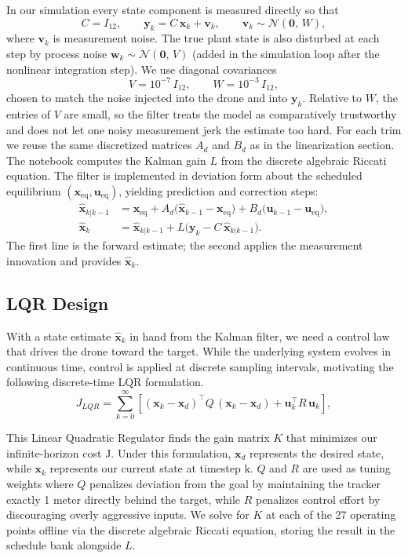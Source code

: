 \documentclass[11pt]{amsart}
\begin{document}
In our simulation every state component is measured directly so that
\[
C = I_{12},
\qquad
\mathbf{y}_k = C\,\mathbf{x}_k + \mathbf{v}_k,
\qquad
\mathbf{v}_k \sim \mathcal{N}(\mathbf{0},\,W),
\]
where $\mathbf{v}_k$ is measurement noise. The true plant state is also disturbed at each step by process noise $\mathbf{w}_k \sim \mathcal{N}(\mathbf{0},\,V)$ (added in the simulation loop after the nonlinear integration step). We use diagonal covariances
\[
V = 10^{-7}\, I_{12},
\qquad
W = 10^{-3}\, I_{12},
\]
chosen to match the noise injected into the drone and into $\mathbf{y}_k$. Relative to $W$, the entries of $V$ are small, so the filter treats the model as comparatively trustworthy and does not let one noisy measurement jerk the estimate too hard.
For each trim we reuse the same discretized matrices $A_d$ and $B_d$ as in the linearization section. The notebook computes the Kalman gain $L$ from the discrete algebraic Riccati equation. The filter is implemented in deviation form about the scheduled equilibrium $(\mathbf{x}_{\mathrm{eq}},\mathbf{u}_{\mathrm{eq}})$, yielding prediction and correction steps:
\begin{align*}
\hat{\mathbf{x}}_{k|k-1}
&= \mathbf{x}_{\mathrm{eq}}
 + A_d\bigl(\hat{\mathbf{x}}_{k-1} - \mathbf{x}_{\mathrm{eq}}\bigr)
 + B_d\bigl(\mathbf{u}_{k-1} - \mathbf{u}_{\mathrm{eq}}\bigr), \\
\hat{\mathbf{x}}_k
&= \hat{\mathbf{x}}_{k|k-1}
 + L\bigl(\mathbf{y}_k - C\,\hat{\mathbf{x}}_{k|k-1}\bigr).
\end{align*}
The first line is the forward estimate; the second applies the measurement innovation and provides $\hat{\mathbf{x}}_k$.


\subsection{LQR Design}

With a state estimate $\hat{\mathbf{x}}_k$ in hand from the Kalman filter, we need a control law that drives the drone toward the target. While the underlying system evolves in continuous time, control is applied at discrete sampling intervals, motivating the following discrete-time LQR formulation. 
\[
J_{LQR} = \sum_{k=0}^{\infty} \left[(\mathbf{x}_k - \mathbf{x}_d)^\top Q\,(\mathbf{x}_k - \mathbf{x}_d) + \mathbf{u}_k^\top R\,\mathbf{u}_k\right],
\]

This Linear Quadratic Regulator finds the gain matrix $K$ that minimizes our infinite-horizon cost J. Under this formulation, $\mathbf{x}_d$ represents the desired state, while $\mathbf{x}_k$ represents our current state at timestep k. $Q$ and $R$ are used as tuning weights where $Q$ penalizes deviation from the goal by maintaining the tracker exactly 1 meter directly behind the target, while $R$ penalizes control effort by discouraging overly aggressive inputs. We solve for $K$ at each of the 27 operating points offline via the discrete algebraic Riccati equation, storing the result in the schedule bank alongside $L$.
\end{document}
